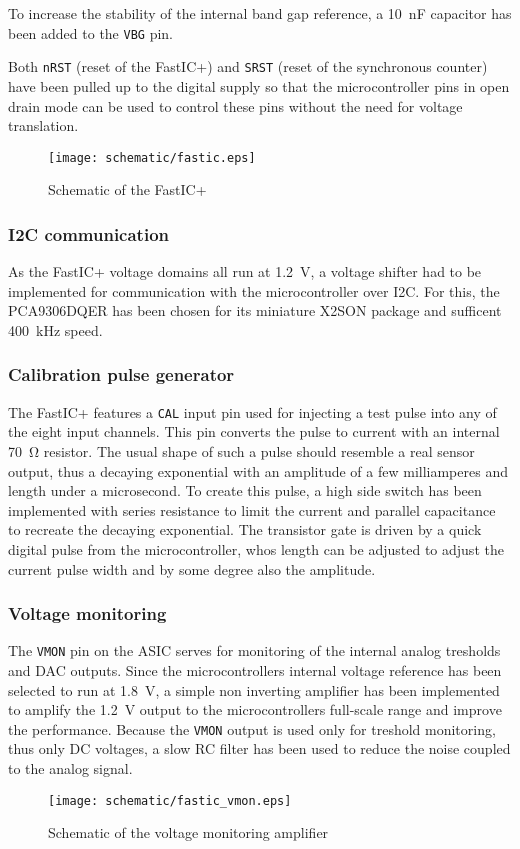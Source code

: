 To increase the stability of the internal band gap reference, a \SI{10}{\nano\farad} capacitor has been added to the \verb|VBG| pin.

Both \verb|nRST| (reset of the FastIC+) and \verb|SRST| (reset of the synchronous counter) have been pulled up to the digital supply so that the microcontroller pins in open drain mode can be used to control these pins without the need for voltage translation. 

\FloatBarrier
\begin{figure}[htp!]
    \centering
    \texttt{[image: schematic/fastic.eps]}
    \caption{Schematic of the FastIC+}
    \label{fig:fastic}
\end{figure}
\FloatBarrier


%
\subsubsection{I2C communication}
As the FastIC+ voltage domains all run at \SI{1.2}{\volt}, a voltage shifter had to be implemented for communication with the microcontroller over I2C. For this, the PCA9306DQER has been chosen for its miniature X2SON package and sufficent \SI{400}{\kilo\hertz} speed. 
%
\subsubsection{Calibration pulse generator}
The FastIC+ features a \verb|CAL| input pin used for injecting a test pulse into any of the eight input channels. This pin converts the pulse to current with an internal \SI{70}{\ohm} resistor. The usual shape of such a pulse should resemble a real sensor output, thus a decaying exponential with an amplitude of a few milliamperes and length under a microsecond. To create this pulse, a high side switch has been implemented with series resistance to limit the current and parallel capacitance to recreate the decaying exponential. The transistor gate is driven by a quick digital pulse from the microcontroller, whos length can be adjusted to adjust the current pulse width and by some degree also the amplitude. 
%
\subsubsection{Voltage monitoring}
%
The \verb|VMON| pin on the ASIC serves for monitoring of the internal analog tresholds and DAC outputs. Since the microcontrollers internal voltage reference has been selected to run at \SI{1.8}{\volt}, a simple non inverting amplifier has been implemented to amplify the \SI{1.2}{\volt} output to the microcontrollers full-scale range and improve the performance. Because the \verb|VMON| output is used only for treshold monitoring, thus only DC voltages, a slow RC filter has been used to reduce the noise coupled to the analog signal.
%
\FloatBarrier
\begin{figure}[htp!]
    \centering
    \texttt{[image: schematic/fastic\_vmon.eps]}
    \caption{Schematic of the voltage monitoring amplifier}
    \label{fig:fastic_vmon}
\end{figure}
\FloatBarrier
%
